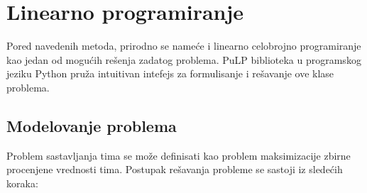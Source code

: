 \documentclass[a4paper]{article}
\begin{document}
\section{Linearno programiranje}

Pored navedenih metoda, prirodno se nameće i linearno celobrojno programiranje kao jedan od mogućih rešenja zadatog problema. PuLP biblioteka u programskog jeziku Python pruža intuitivan intefejs za formulisanje i rešavanje ove klase problema.

\subsection{Modelovanje problema}

Problem sastavljanja tima se može definisati kao problem maksimizacije zbirne procenjene vrednosti tima. Postupak rešavanja probleme se sastoji iz sledećih koraka:
\end{document}
